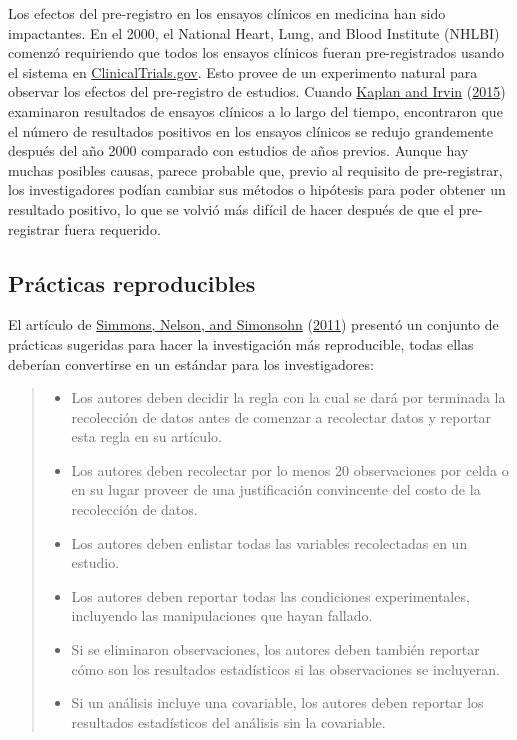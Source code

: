 \documentclass[
  12pt,
]{book}
\providecommand{\tightlist}{%
  \setlength{\itemsep}{0pt}\setlength{\parskip}{0pt}}
\theoremstyle{definition}
\theoremstyle{definition}
\theoremstyle{definition}
\theoremstyle{remark}
\begin{document}
Los efectos del pre-registro en los ensayos clínicos en medicina han sido impactantes. En el 2000, el National Heart, Lung, and Blood Institute (NHLBI) comenzó requiriendo que todos los ensayos clínicos fueran pre-registrados usando el sistema en \href{http://clinicaltrials.gov}{ClinicalTrials.gov}. Esto provee de un experimento natural para observar los efectos del pre-registro de estudios. Cuando \protect\hyperlink{ref-kapl:irvi:2015}{Kaplan and Irvin} (\protect\hyperlink{ref-kapl:irvi:2015}{2015}) examinaron resultados de ensayos clínicos a lo largo del tiempo, encontraron que el número de resultados positivos en los ensayos clínicos se redujo grandemente después del año 2000 comparado con estudios de años previos. Aunque hay muchas posibles causas, parece probable que, previo al requisito de pre-registrar, los investigadores podían cambiar sus métodos o hipótesis para poder obtener un resultado positivo, lo que se volvió más difícil de hacer después de que el pre-registrar fuera requerido.

\hypertarget{pruxe1cticas-reproducibles}{%
\subsection{Prácticas reproducibles}\label{pruxe1cticas-reproducibles}}

El artículo de \protect\hyperlink{ref-simm:nels:simo:2011}{Simmons, Nelson, and Simonsohn} (\protect\hyperlink{ref-simm:nels:simo:2011}{2011}) presentó un conjunto de prácticas sugeridas para hacer la investigación más reproducible, todas ellas deberían convertirse en un estándar para los investigadores:

\begin{quote}
\begin{itemize}
\tightlist
\item
  Los autores deben decidir la regla con la cual se dará por terminada la recolección de datos antes de comenzar a recolectar datos y reportar esta regla en su artículo.
\item
  Los autores deben recolectar por lo menos 20 observaciones por celda o en su lugar proveer de una justificación convincente del costo de la recolección de datos.
\item
  Los autores deben enlistar todas las variables recolectadas en un estudio.
\item
  Los autores deben reportar todas las condiciones experimentales, incluyendo las manipulaciones que hayan fallado.
\item
  Si se eliminaron observaciones, los autores deben también reportar cómo son los resultados estadísticos si las observaciones se incluyeran.
\item
  Si un análisis incluye una covariable, los autores deben reportar los resultados estadísticos del análisis sin la covariable.
\end{itemize}
\end{quote}
\end{document}
